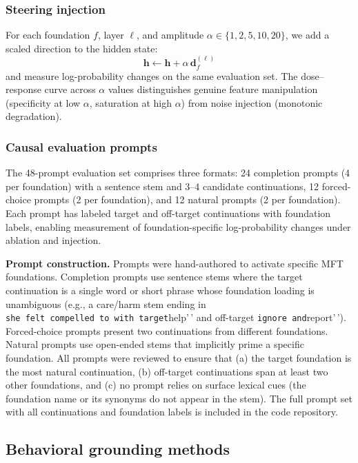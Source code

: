 \subsubsection{Steering injection}\label{steering-injection}

For each foundation \(f\), layer \(\ell\), and amplitude \(\alpha \in \{1, 2, 5, 10, 20\}\), we add a scaled direction to the hidden state:
\[\mathbf{h} \leftarrow \mathbf{h} + \alpha \, \mathbf{d}_f^{(\ell)}\]
and measure log-probability changes on the same evaluation set.
The dose--response curve across \(\alpha\) values distinguishes genuine feature manipulation (specificity at low \(\alpha\), saturation at high \(\alpha\)) from noise injection (monotonic degradation).

\subsubsection{Causal evaluation prompts}\label{causal-evaluation-prompts}

The 48-prompt evaluation set comprises three formats: 24 completion prompts (4 per foundation) with a sentence stem and 3--4 candidate continuations, 12 forced-choice prompts (2 per foundation), and 12 natural prompts (2 per foundation).
Each prompt has labeled target and off-target continuations with foundation labels, enabling measurement of foundation-specific log-probability changes under ablation and injection.

\textbf{Prompt construction.} Prompts were hand-authored to activate specific MFT foundations.
Completion prompts use sentence stems where the target continuation is a single word or short phrase whose foundation loading is unambiguous (e.g., a care/harm stem ending in \texttt{she\ felt\ compelled\ to\textquotesingle{}\textquotesingle{}\ with\ target}help'\,' and off-target \texttt{ignore\textquotesingle{}\textquotesingle{}\ and}report'\,').
Forced-choice prompts present two continuations from different foundations.
Natural prompts use open-ended stems that implicitly prime a specific foundation.
All prompts were reviewed to ensure that (a) the target foundation is the most natural continuation, (b) off-target continuations span at least two other foundations, and (c) no prompt relies on surface lexical cues (the foundation name or its synonyms do not appear in the stem).
The full prompt set with all continuations and foundation labels is included in the code repository.

\subsection{Behavioral grounding methods}\label{behavioral-grounding-methods}


